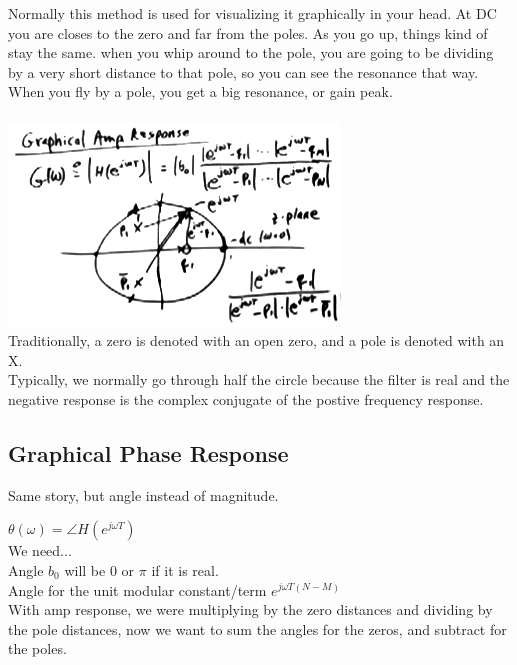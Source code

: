 Normally this method is used for visualizing it graphically in your head. At DC
you are closes to the zero and far from the poles. As you go up, things kind of 
stay the same. when you whip around to the pole, you are going to be 
dividing by a very short distance to that pole, so you can see the resonance that way.
\\
When you fly by a pole, you get a big resonance, or gain peak. 
\\
\\
\includegraphics[scale=0.8]{frames/12e}
\\
Traditionally, a zero is denoted with an open zero, and a pole is denoted with an X. 
\\
Typically, we normally go through half the circle because the filter is real
and the negative response is the complex conjugate of the postive frequency 
response.\\


\subsection*{Graphical Phase Response}
Same story, but angle instead of magnitude. 

$\theta(\omega) = \angle H(e^{j\omega T})$ \\

We need...\\
Angle $b_0$ will be $0$ or $\pi$ if it is real. \\
Angle for the unit modular constant/term $e^{j\omega T (N - M)}$\\

With amp response, we were multiplying by the zero distances and dividing
by the pole distances, now we want to sum the angles for the zeros, and subtract
for the poles. 


